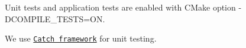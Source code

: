 Unit tests and application tests are enabled with C\+Make option {\ttfamily -\/\+D\+C\+O\+M\+P\+I\+L\+E\+\_\+\+T\+E\+S\+TS=ON}.

We use \href{https://github.com/philsquared/Catch}{\tt Catch framework} for unit testing. 